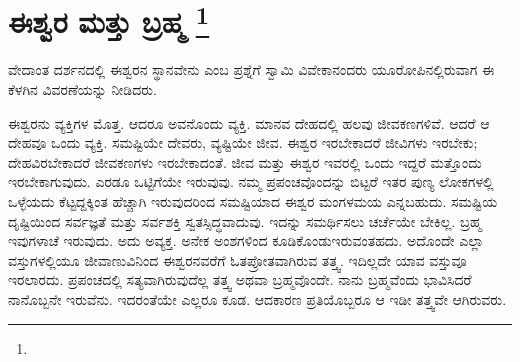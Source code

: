 
\chapter[ಈಶ್ವರ ಮತ್ತು ಬ್ರಹ್ಮ ]{ಈಶ್ವರ ಮತ್ತು ಬ್ರಹ್ಮ \protect\footnote{}}

ವೇದಾಂತ ದರ್ಶನದಲ್ಲಿ ಈಶ್ವರನ ಸ್ಥಾನವೇನು ಎಂಬ ಪ್ರಶ್ನೆಗೆ ಸ್ವಾಮಿ ವಿವೇಕಾನಂದರು ಯೂರೋಪಿನಲ್ಲಿರುವಾಗ ಈ ಕೆಳಗಿನ ವಿವರಣೆಯನ್ನು ನೀಡಿದರು.

ಈಶ್ವರನು ವ್ಯಕ್ತಿಗಳ ಮೊತ್ತ. ಆದರೂ ಅವನೊಂದು ವ್ಯಕ್ತಿ. ಮಾನವ ದೇಹದಲ್ಲಿ ಹಲವು ಜೀವಕಣಗಳಿವೆ. ಆದರೆ ಆ ದೇಹವೂ ಒಂದು ವ್ಯಕ್ತಿ. ಸಮಷ್ಟಿಯೇ ದೇವರು, ವ್ಯಷ್ಟಿಯೇ ಜೀವ. ಈಶ್ವರ ಇರಬೇಕಾದರೆ ಜೀವಿಗಳು ಇರಬೇಕು; ದೇಹವಿರಬೇಕಾದರೆ ಜೀವಕಣಗಳು  ಇರಬೇಕಾದಂತೆ. ಜೀವ ಮತ್ತು ಈಶ್ವರ ಇವರಲ್ಲಿ ಒಂದು ಇದ್ದರೆ ಮತ್ತೊಂದು ಇರಬೇಕಾಗುವುದು. ಎರಡೂ ಒಟ್ಟಿಗೆಯೇ ಇರುವುವು. ನಮ್ಮ ಪ್ರಪಂಚವೊಂದನ್ನು ಬಿಟ್ಟರೆ ಇತರ ಪುಣ್ಯ ಲೋಕಗಳಲ್ಲಿ ಒಳ್ಳೆಯದು ಕೆಟ್ಟದ್ದಕ್ಕಿಂತ ಹೆಚ್ಚಾಗಿ ಇರುವುದರಿಂದ ಸಮಷ್ಟಿಯಾದ ಈಶ್ವರ ಮಂಗಳಮಯ ಎನ್ನಬಹುದು. ಸಮಷ್ಟಿಯ ದೃಷ್ಟಿಯಿಂದ ಸರ್ವಜ್ಞತೆ ಮತ್ತು ಸರ್ವಶಕ್ತಿ ಸ್ವತಸ್ಸಿದ್ಧವಾದುವು. ಇದನ್ನು ಸಮರ್ಥಿಸಲು ಚರ್ಚೆಯೇ ಬೇಕಿಲ್ಲ. ಬ್ರಹ್ಮ ಇವುಗಳಾಚೆ ಇರುವುದು. ಅದು ಅವ್ಯಕ್ತ. ಅನೇಕ ಅಂಶಗಳಿಂದ ಕೂಡಿಕೊಂಡು\break ಇರುವಂತಹದು. ಅದೊಂದೇ ಎಲ್ಲಾ ವಸ್ತುಗಳಲ್ಲಿಯೂ ಜೀವಾಣುವಿನಿಂದ ಈಶ್ವರನವರೆಗೆ ಓತಪ್ರೋತವಾಗಿರುವ ತತ್ತ್ವ. ಇದಿಲ್ಲದೇ ಯಾವ ವಸ್ತುವೂ ಇರಲಾರದು. ಪ್ರಪಂಚದಲ್ಲಿ ಸತ್ಯವಾಗಿರುವುದೆಲ್ಲ ತತ್ತ್ವ ಅಥವಾ ಬ್ರಹ್ಮವೊಂದೇ. ನಾನು ಬ್ರಹ್ಮವೆಂದು ಭಾವಿಸಿದರೆ ನಾನೊಬ್ಬನೇ ಇರುವೆನು. ಇದರಂತೆಯೇ ಎಲ್ಲರೂ ಕೂಡ. ಆದಕಾರಣ ಪ್ರತಿಯೊಬ್ಬರೂ ಆ ಇಡೀ ತತ್ತ್ವವೇ ಆಗಿರುವರು.

